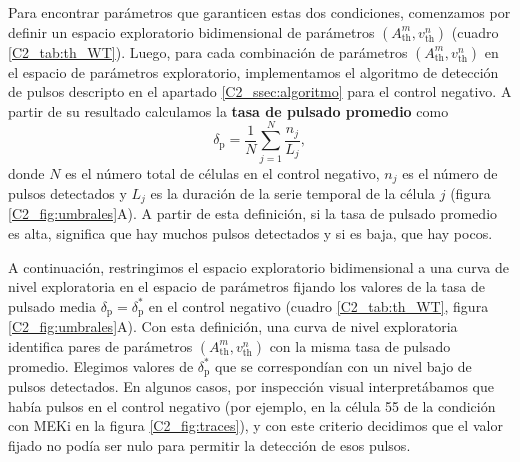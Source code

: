 \documentclass[./main.tex]{subfiles}
\begin{document}
Para encontrar parámetros que garanticen estas dos condiciones, comenzamos por definir un espacio exploratorio bidimensional de parámetros $(A_{\text{th}}^m , v_{\text{th}}^n)$ (cuadro \ref{C2_tab:th_WT}). Luego, para cada combinación de parámetros $(A_{\text{th}}^m , v_{\text{th}}^n)$ en el espacio de parámetros exploratorio, implementamos el algoritmo de detección de pulsos descripto en el apartado \ref{C2_ssec:algoritmo} para el control negativo. A partir de su resultado calculamos la \textbf{tasa de pulsado promedio} como  
\begin{equation}
    \delta_\text{p} = \frac{1}{N} \sum_{j=1}^N \frac{n_j}{L_j},
\end{equation}
donde $N$ es el número total de células en el control negativo, $n_j$ es el número de pulsos detectados y $L_j$ es la duración de la serie temporal de la célula $j$ (figura \ref{C2_fig:umbrales}A). A partir de esta definición, si la tasa de pulsado promedio es alta, significa que hay muchos pulsos detectados y si es baja, que hay pocos. 


A continuación, restringimos el espacio exploratorio bidimensional a una curva de nivel exploratoria en el espacio de parámetros fijando los valores de la tasa de pulsado media $\delta_\text{p}= \delta_\text{p}^*$ en el control negativo (cuadro \ref{C2_tab:th_WT}, figura \ref{C2_fig:umbrales}A). Con esta definición, una curva de nivel exploratoria identifica pares de parámetros $(A_{\text{th}}^m , v_{\text{th}}^n)$  con la misma tasa de pulsado promedio. Elegimos valores de $\delta_\text{p}^*$ que se correspondían con un nivel bajo de pulsos detectados. En algunos casos, por inspección visual interpretábamos que había pulsos en el control negativo (por ejemplo, en la célula 55 de la condición con MEKi en la figura \ref{C2_fig:traces}), y con este criterio decidimos que el valor fijado no podía ser nulo para permitir la detección de esos pulsos. 
\end{document}
